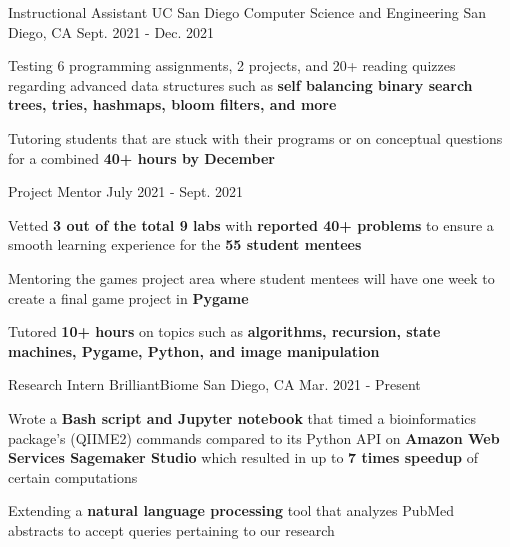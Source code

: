 

\begin{cventries}

  \cvtwoentry
    {Instructional Assistant}
    {UC San Diego Computer Science and Engineering} %
    {San Diego, CA} %
    {Sept. 2021 - Dec. 2021}
    {
      \begin{cvitems}
        \item {Testing 6 programming assignments, 2 projects, and 20+ reading quizzes regarding advanced data structures such as \textbf{self balancing binary search trees, tries, hashmaps, bloom filters, and more}}
        \item {Tutoring students that are stuck with their programs or on conceptual questions for a combined \textbf{40+ hours by December}}
      \end{cvitems}
    }
    {Project Mentor} %
    {July 2021 - Sept. 2021} %
    {
      \begin{cvitems} %
        \item {Vetted \textbf{3 out of the total 9 labs} with \textbf{reported 40+ problems} to ensure a smooth learning experience for the \textbf{55 student mentees}}
        \item {Mentoring the games project area where student mentees will have one week to create a final game project in \textbf{Pygame}}
        \item {Tutored \textbf{10+ hours} on topics such as \textbf{algorithms, recursion, state machines, Pygame, Python, and image manipulation}}
      \end{cvitems}
    }

  \cventry
    {Research Intern} %
    {BrilliantBiome} %
    {San Diego, CA} %
    {Mar. 2021 - Present} %
    {
      \begin{cvitems} %
        \item { Wrote a \textbf{Bash script and Jupyter notebook} that timed a bioinformatics package's (QIIME2) commands compared to its Python API on \textbf{Amazon Web Services Sagemaker Studio} which resulted in up to \textbf{7 times speedup} of certain computations}
        \item { Extending a \textbf{natural language processing} tool that analyzes PubMed abstracts to accept queries pertaining to our research }
      \end{cvitems}
    }


\end{cventries}
